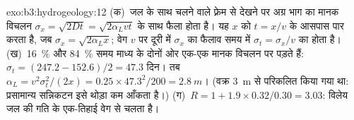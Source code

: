 \begin{solution}{exo:b3:hydrogeology:12}
(क)~जल के साथ चलने वाले फ़्रेम से देखने पर अग्र भाग का मानक विचलन
$\sigma_x = \sqrt{2Dt} = \sqrt{2\alpha_Lvt}$ के साथ फैला होता है। यह
$x$ को $t = x/v$ के आसपास पार करता है, जब $\sigma_x = \sqrt{2\alpha_Lx}$; वेग
$v$ पर दूरी में $\sigma_x$ का फैलाव समय में $\sigma_t = \sigma_x/v$ का होता है।
(ख)~\qty{16}{\percent} और \qty{84}{\percent} समय
माध्य के दोनों ओर एक-एक मानक विचलन पर पड़ते हैं: $\sigma_t = (247.2 -
152.6)/2 = \num{47.3}\text{ दिन}$। तब $\alpha_L = v^2\sigma_t^2/(2x) =
0.25\times47.3^2/200 = \qty{2.8}{m}$। (वक्र \qty{3}{m} से परिकलित किया गया था:
प्रसामान्य सन्निकटन इसे थोड़ा कम आँकता है।) (ग)~$R =
1 + 1.9\times0.32/0.30 = \num{3.03}$: विलेय जल की गति के एक-तिहाई
वेग से चलता है।
\end{solution}


